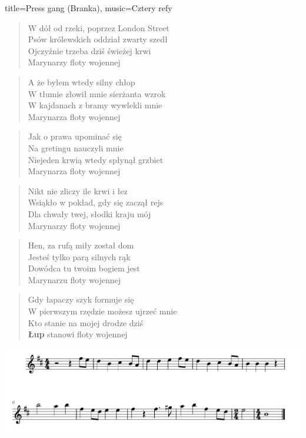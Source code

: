 \newpage
\begin{song}{title={Press gang (Branka)}, music={Cztery refy}}
\begin{multicols}{2}
    \begin{verse}
        W dół od rzeki, poprzez London Street\\
		Psów królewskich oddział zwarty szedł\\
		Ojczyźnie trzeba dziś świeżej krwi\\
		Marynarzy floty wojennej\\
    \end{verse}
    \begin{verse}
       A że byłem wtedy silny chłop\\
       W tłumie złowił mnie sierżanta wzrok \\
       W kajdanach z bramy wywlekli mnie \\
       Marynarza floty wojennej \\
    \end{verse}
    \begin{verse}
    Jak o prawa upominać się \\
    Na gretingu nauczyli mnie \\
    Niejeden krwią wtedy spłynął grzbiet \\
    Marynarza floty wojennej \\
    \end{verse}
    \begin{verse}
	Nikt nie zliczy ile krwi i łez \\
	Wsiąkło w pokład, gdy się zaczął rejs \\
	Dla chwały twej, słodki kraju mój \\
	Marynarzy floty wojennej \\
    \end{verse}
    \begin{verse}
	Hen, za rufą miły został dom \\
	Jesteś tylko parą silnych rąk \\
	Dowódca tu twoim bogiem jest \\
	Marynarzu floty wojennej \\
    \end{verse}
    \begin{verse}
    Gdy łapaczy szyk formuje się \\
	W pierwszym rzędzie możesz ujrzeć mnie \\
	Kto stanie na mojej drodze dziś \\ 
	\textbf{Łup} stanowi floty wojennej \\
    \end{verse}
\end{multicols}
\includegraphics[width=\textwidth]{sheet_music/cztery_refy-press_gang.png}  
\end{song}
\newpage
